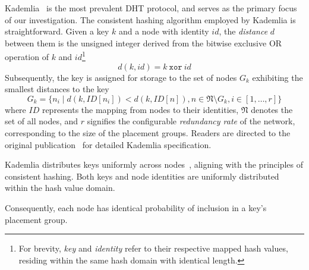 Kademlia~\cite{maymounkov2002kademlia} is the most prevalent DHT protocol, and serves as the primary focus of our investigation.
The consistent hashing algorithm employed by Kademlia is straightforward.
Given a key $k$ and a node with identity $id$, the \emph{distance} $d$ between them is the unsigned integer derived from the bitwise exclusive OR operation of $k$ and $id$\footnote{
    For brevity, \emph{key} and \emph{identity} refer to their respective mapped hash values, residing within the same hash domain with identical length.
}
\[
    d(k,id)=k\ \texttt{xor}\ id
\]
Subsequently, the key is assigned for storage to the set of nodes $G_k$ exhibiting the smallest distances to the key
\[
    G_k=\{n_i\mid{}d(k,ID[n_i])<d(k,ID[n]),n\in{}\mathfrak{N}\setminus{}G_k,i\in{}[1,\dots,r]\}
\]
where $ID$ represents the mapping from nodes to their identities, $\mathfrak{N}$ denotes the set of all nodes, and $r$ signifies the configurable \emph{redundancy rate} of the network, corresponding to the size of the placement groups.
Readers are directed to the original publication~\cite{maymounkov2002kademlia} for detailed Kademlia specification.

Kademlia distributes keys uniformly across nodes~\cite{chord}, aligning with the principles of consistent hashing.
Both keys and node identities are uniformly distributed within the hash value domain.

Consequently, each node has identical probability of inclusion in a key's placement group.

